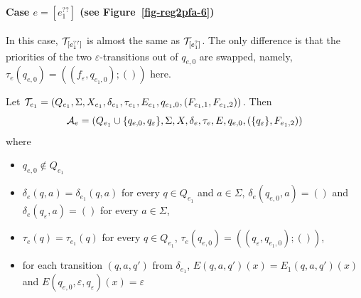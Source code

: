 \paragraph{Case $e = [e_1^{??}]$ (see Figure~\ref{fig-reg2pfa-6})}  In this case, $\mathcal{T}_{[e_1^{??}]}$ is  almost the same as $\mathcal{T}_{[e_1^{?}]}$. The only difference is that the priorities of the two $\varepsilon$-transitions out of $q_{e,0}$ are swapped, namely, $\tau_e(q_{e,0}) = ((f_{\varepsilon}, q_{e_1,0}); ())$ here.
\OMIT
{
Let $\mathcal{T}_{e_1} = (Q_{e_1},
		\Sigma, X_{e_1}, \delta_{e_1}, \tau_{e_1}, E_{e_1} , q_{e_1,0}, (F_{e_1,1}, F_{e_1,2}))$. 
Then 
\[\mathcal{A}_e = (Q_{e_1} \cup \{q_{e,0}, q_{\varepsilon}\}, \Sigma, X, 
		\delta_e, \tau_e, E, q_{e,0}, (\{q_{\varepsilon}\}, F_{e_1,2}))\] 
where 
		\begin{itemize}
			\item $q_{e,0}  \not \in Q_{e_1}$
			\item $\delta_e(q, a) = \delta_{e_1}(q, a)$ for every $q \in Q_{e_1}$ and $a \in \Sigma$, $\delta_e(q_{e,0}, a)  = ()$ and $\delta_e(q_{\varepsilon}, a) = ()$ for every $a \in \Sigma$, 
			\item $\tau_e(q) = \tau_{e_1}(q)$ for every $q \in Q_{e_1}$, $\tau_e(q_{e,0}) = ((q_{\varepsilon}, q_{e_1,0}); ())$,
			
			\item for each transition $(q, a, q')$ from $\delta_{e_1}$, $E(q,a,q')(x) = E_1(q,a,q')(x)$ and $E(q_{e,0},\varepsilon,q_{\varepsilon})(x) =\varepsilon$
		\end{itemize}
}

